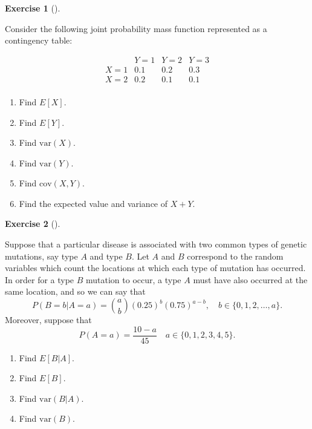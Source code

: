 \documentclass[
  letterpaper,
  DIV=11,
  numbers=noendperiod]{scrreprt}
\providecommand{\tightlist}{%
  \setlength{\itemsep}{0pt}\setlength{\parskip}{0pt}}\usepackage{longtable,booktabs,array}
\theoremstyle{definition}
\newtheorem{exercise}{Exercise}[chapter]
\theoremstyle{definition}
\theoremstyle{definition}
\theoremstyle{remark}
\begin{document}
\begin{exercise}[]\protect\hypertarget{exr-7.4}{}\label{exr-7.4}

Consider the following joint probability mass function represented as a
contingency table:

\[
\begin{array}{c|ccc}
    & Y = 1 & Y = 2 & Y = 3 \\
\hline
X = 1 & 0.1 & 0.2 & 0.3 \\
X = 2 & 0.2 & 0.1 & 0.1 \\
\end{array}
\]

\begin{enumerate}
\def\labelenumi{\alph{enumi}.}
\tightlist
\item
  Find \(E[X]\).
\item
  Find \(E[Y]\).
\item
  Find \(\text{var}(X)\).
\item
  Find \(\text{var}(Y)\).
\item
  Find \(\text{cov}(X,Y)\).
\item
  Find the expected value and variance of \(X+Y\).
\end{enumerate}

\end{exercise}

\begin{exercise}[]\protect\hypertarget{exr-7.5}{}\label{exr-7.5}

Suppose that a particular disease is associated with two common types of
genetic mutations, say type \(A\) and type \(B\). Let \(A\) and \(B\)
correspond to the random variables which count the locations at which
each type of mutation has occurred. In order for a type \(B\) mutation
to occur, a type \(A\) must have also occurred at the same location, and
so we can say that
\[P(B=b|A=a) = \binom{a}{b}(0.25)^b(0.75)^{a-b}, \quad b\in\{0,1,2,\dots, a\}.\]
Moreover, suppose that
\[P(A=a) = \frac{10-a}{45} \quad a\in\{0,1,2,3,4,5\}.\]

\begin{enumerate}
\def\labelenumi{\alph{enumi}.}
\tightlist
\item
  Find \(E[B|A]\).
\item
  Find \(E[B]\).
\item
  Find \(\text{var}(B|A)\).
\item
  Find \(\text{var}(B)\).
\end{enumerate}

\end{exercise}
\end{document}
